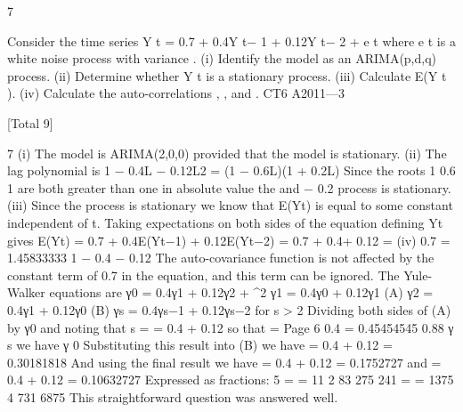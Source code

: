 
7

Consider the time series
Y t = 0.7 + 0.4Y t− 1 + 0.12Y t− 2 + e t
where e t is a white noise process with variance  .
(i) Identify the model as an ARIMA(p,d,q) process. 
(ii) Determine whether Y t is a stationary process. 
(iii) Calculate E(Y t ). 
(iv) Calculate the auto-correlations  ,  ,  and  .
CT6 A2011—3

[Total 9]


7
(i) The model is ARIMA(2,0,0) provided that the model is stationary.
(ii) The lag polynomial is 1 − 0.4L − 0.12L2 = (1 − 0.6L)(1 + 0.2L)
Since the roots
1
0.6
1 are both greater than one in absolute value the
and − 0.2
process is stationary.
(iii)
Since the process is stationary we know that E(Yt) is equal to some constant \mu 
independent of t.
Taking expectations on both sides of the equation defining Yt gives
E(Yt) = 0.7 + 0.4E(Yt−1) + 0.12E(Yt−2)
\mu  = 0.7 + 0.4\mu  + 0.12\mu 
\mu  =
(iv)
0.7
= 1.45833333
1 − 0.4 − 0.12
The auto-covariance function is not affected by the constant term of 0.7 in the
equation, and this term can be ignored.
The Yule-Walker equations are
γ0 = 0.4γ1 + 0.12γ2 + \sigma^{2}
γ1 = 0.4γ0 + 0.12γ1 (A)
γ2 = 0.4γ1 + 0.12γ0 (B)
γs = 0.4γs−1 + 0.12γs−2 for s > 2
Dividing both sides of (A) by γ0 and noting that \rho  s =
 = 0.4 + 0.12 so that  =
Page 6
0.4
= 0.45454545
0.88
γ s
we have
γ 0%
Substituting this result into (B) we have
 = 0.4  + 0.12 = 0.30181818
And using the final result we have
 = 0.4  + 0.12  = 0.1752727
and
 = 0.4  + 0.12  = 0.10632727
Expressed as fractions:
5 \rho  =
 = 11
2
83
275
241 \rho  =
 = 1375
4
731
6875
This straightforward question was answered well.
